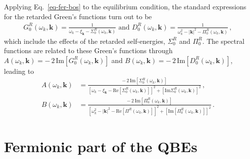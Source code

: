 \documentclass[aps, prb, onecolumn, nofootinbib, citeautoscript, 10pt]{revtex4-2}
\def \nn{\nonumber \\}
\newcommand{\bk}{\mathbf{k}}
\begin{document}
Applying Eq.~\eqref{eq-fer-bos} to the equilibrium condition, the standard expressions for the retarded Green's functions turn out to be
\begin{align}
G_0^R(\omega_k, \bk )   =  \frac{1} {\omega_k -\xi_\bk-\Sigma_0^R(\omega_k, \bk )} \text{ and }
D_0^R(\omega_k, \bk )   =  \frac{1} {\omega_k^2-|\bk|^2-\Pi_0^R(\omega_k, \bk )}\,,
\label{eq-bos-propr}
\end{align} 
which include the effects of the retarded self-energies, $\Sigma_0^R$ and $\Pi_0^R$.
The spectral functions are related to these Green's functions through $A(\omega_k, \bk )
= - \,2 \,\text{Im}[G_0^R(\omega_k, \bk ) ]$ and  $ B(\omega_k, \bk )=- \,2 \,
\text{Im} [D_0^R(\omega_k, \bk )]$, leading to
\begin{align}
	\label{eqspec}
	A(\omega_k, \bk ) & = 
	\frac{ - \,2  \,  \text{Im} [\Sigma_0^R(\omega_k, \bk )] }
	{\left[\omega_k - \xi_\bk-\text{Re}[ \Sigma_0^R(\omega_k, \bk )] \right]^2 
		+  \left[\text{Im}\Sigma_0^R(\omega_k, \bk )\right]^2} \,, \nn
	B(\omega_k, \bk ) & = 
	\frac{- \,2 \, \text{Im} [\Pi_0^R (\omega_k, \bk )] }
	{\left[\omega_k^2-|\bk|^2 -\text{Re} [\Pi^R (\omega_k, \bk )] \right]^2 
		+  \left[\text{Im} [ \Pi_0^R(\omega_k, \bk )] \right]^2} \,.
\end{align}



\section{Fermionic part of the QBEs}
\label{appfer}
\end{document}
